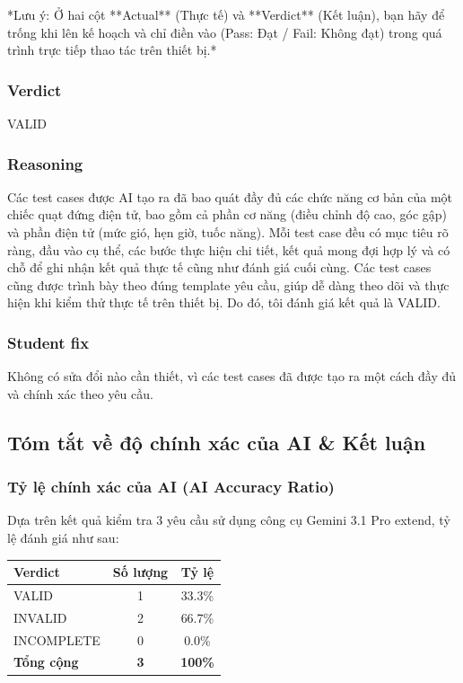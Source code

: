 *Lưu ý: Ở hai cột **Actual** (Thực tế) và **Verdict** (Kết luận), bạn hãy để trống khi lên kế hoạch và chỉ điền vào (Pass: Đạt / Fail: Không đạt) trong quá trình trực tiếp thao tác trên thiết bị.*

\vspace{0.1cm}

\subsubsection{Verdict}
VALID

\subsubsection{Reasoning}
Các test cases được AI tạo ra đã bao quát đầy đủ các chức năng cơ bản của một chiếc quạt đứng điện tử, bao gồm cả phần cơ năng (điều chỉnh độ cao, góc gập) và phần điện tử (mức gió, hẹn giờ, tuốc năng). Mỗi test case đều có mục tiêu rõ ràng, đầu vào cụ thể, các bước thực hiện chi tiết, kết quả mong đợi hợp lý và có chỗ để ghi nhận kết quả thực tế cũng như đánh giá cuối cùng. Các test cases cũng được trình bày theo đúng template yêu cầu, giúp dễ dàng theo dõi và thực hiện khi kiểm thử thực tế trên thiết bị. Do đó, tôi đánh giá kết quả là VALID.

\subsubsection{Student fix}
Không có sửa đổi nào cần thiết, vì các test cases đã được tạo ra một cách đầy đủ và chính xác theo yêu cầu.

\subsection{Tóm tắt về độ chính xác của AI \& Kết luận}

\subsubsection{Tỷ lệ chính xác của AI (AI Accuracy Ratio)}

Dựa trên kết quả kiểm tra 3 yêu cầu sử dụng công cụ Gemini 3.1 Pro extend, tỷ lệ đánh giá như sau:

\begin{center}
\begin{tabular}{|l|c|c|}
\hline
\textbf{Verdict} & \textbf{Số lượng} & \textbf{Tỷ lệ} \\
\hline
VALID & 1 & 33.3\% \\
\hline
INVALID & 2 & 66.7\% \\
\hline
INCOMPLETE & 0 & 0.0\% \\
\hline
\textbf{Tổng cộng} & \textbf{3} & \textbf{100\%} \\
\hline
\end{tabular}
\end{center}

